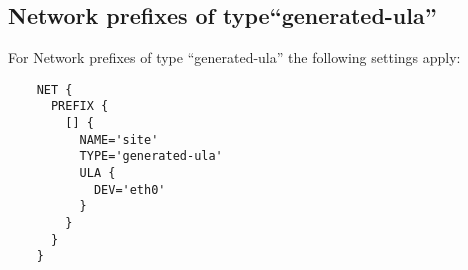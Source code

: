 \subsection{Network prefixes of type``generated-ula''}
For Network prefixes of type ``generated-ula'' the following settings apply:

\begin{description}
  \begin{example}
  \begin{verbatim}
    NET {
      PREFIX {
        [] {
          NAME='site'
          TYPE='generated-ula'
          ULA {
            DEV='eth0'
          }
        }
      }
    }
  \end{verbatim}
  \end{example}

\end{description}
